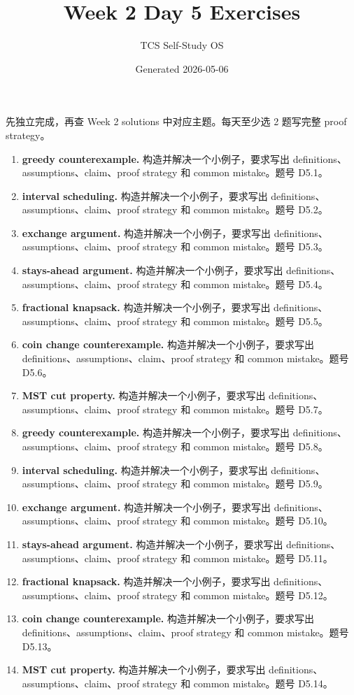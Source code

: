 \documentclass[11pt]{ctexart}
\title{Week 2 Day 5 Exercises}
\author{TCS Self-Study OS}
\date{Generated 2026-05-06}
\begin{document}
\maketitle
先独立完成，再查 Week 2 solutions 中对应主题。每天至少选 2 题写完整 proof strategy。
\begin{enumerate}
  \item \textbf{greedy counterexample.} 构造并解决一个小例子，要求写出 definitions、assumptions、claim、proof strategy 和 common mistake。题号 D5.1。
  \item \textbf{interval scheduling.} 构造并解决一个小例子，要求写出 definitions、assumptions、claim、proof strategy 和 common mistake。题号 D5.2。
  \item \textbf{exchange argument.} 构造并解决一个小例子，要求写出 definitions、assumptions、claim、proof strategy 和 common mistake。题号 D5.3。
  \item \textbf{stays-ahead argument.} 构造并解决一个小例子，要求写出 definitions、assumptions、claim、proof strategy 和 common mistake。题号 D5.4。
  \item \textbf{fractional knapsack.} 构造并解决一个小例子，要求写出 definitions、assumptions、claim、proof strategy 和 common mistake。题号 D5.5。
  \item \textbf{coin change counterexample.} 构造并解决一个小例子，要求写出 definitions、assumptions、claim、proof strategy 和 common mistake。题号 D5.6。
  \item \textbf{MST cut property.} 构造并解决一个小例子，要求写出 definitions、assumptions、claim、proof strategy 和 common mistake。题号 D5.7。
  \item \textbf{greedy counterexample.} 构造并解决一个小例子，要求写出 definitions、assumptions、claim、proof strategy 和 common mistake。题号 D5.8。
  \item \textbf{interval scheduling.} 构造并解决一个小例子，要求写出 definitions、assumptions、claim、proof strategy 和 common mistake。题号 D5.9。
  \item \textbf{exchange argument.} 构造并解决一个小例子，要求写出 definitions、assumptions、claim、proof strategy 和 common mistake。题号 D5.10。
  \item \textbf{stays-ahead argument.} 构造并解决一个小例子，要求写出 definitions、assumptions、claim、proof strategy 和 common mistake。题号 D5.11。
  \item \textbf{fractional knapsack.} 构造并解决一个小例子，要求写出 definitions、assumptions、claim、proof strategy 和 common mistake。题号 D5.12。
  \item \textbf{coin change counterexample.} 构造并解决一个小例子，要求写出 definitions、assumptions、claim、proof strategy 和 common mistake。题号 D5.13。
  \item \textbf{MST cut property.} 构造并解决一个小例子，要求写出 definitions、assumptions、claim、proof strategy 和 common mistake。题号 D5.14。
\end{enumerate}
\end{document}
